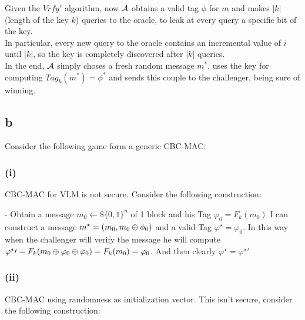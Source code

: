 \documentclass[11pt]{article}
\newcounter{t0d0_counter}
\begin{document}
Given the $Vrfy'$ algorithm, now $\mathcal{A}$ obtains a valid tag $\phi$ for $m$ and
makes $|k|$ (length of the key $k$) queries to the oracle, to leak at every 
query a specific bit of the key.\\
In particular, every new query to the oracle contains an incremental value of
$i$ until $|k|$, so the key is completely discovered after $|k|$ queries.\\

In the end, $\mathcal{A}$ simply choses a fresh random message $m^{*}$, uses the key for
computing $Tag_{k}(m^{*})=\phi^{*}$ and sends this couple to the challenger,
being sure of winning.

\subsection{b}

Consider the following game form a generic CBC-MAC:

\begin{figure}[h!]
   \centering
   \sdinit{}
\end{figure}

\subsubsection{(i)}
CBC-MAC for VLM is not secure. Consider the following construction:

- Obtain a message $m_0\leftarrow\$\{0,1\}^n$ of 1 block and his Tag $\varphi_0 =F_k(m_0)$
I can construct a message $m^\star=(m_0,m_0\oplus \phi_0)$ and a valid Tag $\varphi^\star=\varphi_0$.
In this way when the challenger will verify the message he will compute $\varphi^\star\prime=F_k(m_0\oplus\varphi_0\oplus\varphi_0)=F_k(m_0)=\varphi_0$. 
And then clearly $\varphi^\star=\varphi^\star\prime$

\subsubsection{(ii)}
CBC-MAC using randomness as initialization vector. This isn't secure, consider the following construction:
\end{document}
